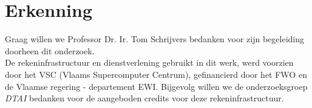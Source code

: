 \documentclass{article}
\begin{document}
\section*{Erkenning}
Graag willen we Professor Dr. Ir. Tom Schrijvers bedanken voor zijn begeleiding doorheen dit onderzoek.\\
De rekeninfrastructuur en dienstverlening gebruikt in dit werk, werd voorzien door het VSC (Vlaams Supercomputer Centrum), gefinancierd door het FWO en de Vlaamse regering - departement EWI.
Bijgevolg willen we de onderzoeksgroep \textit{DTAI} bedanken voor de aangeboden credits voor deze rekeninfrastructuur.



\end{document}
